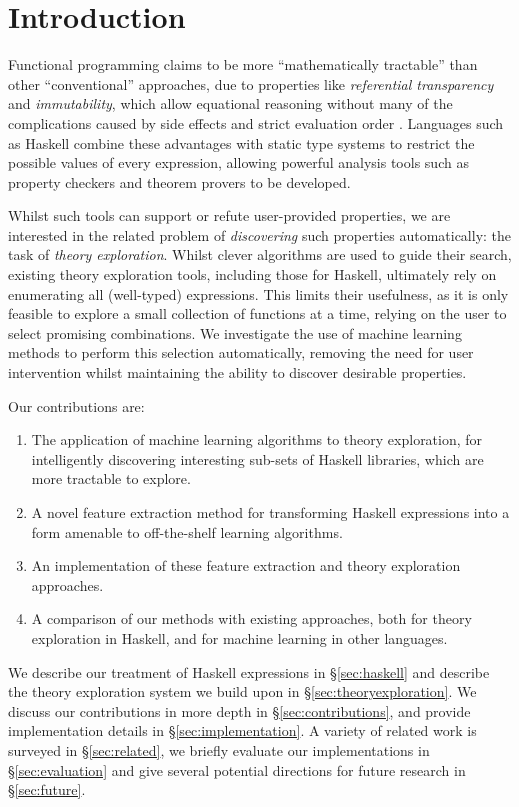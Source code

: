 \section{Introduction}

Functional programming claims to be more ``mathematically tractable'' than other ``conventional'' approaches, due to properties like \emph{referential transparency} and \emph{immutability}, which allow equational reasoning without many of the complications caused by side effects and strict evaluation order \cite{hughes1989functional}. Languages such as Haskell combine these advantages with static type systems to restrict the possible values of every expression, allowing powerful analysis tools such as property checkers \cite{claessen2011quickcheck} and theorem provers \cite{rosen2012proving} to be developed.

Whilst such tools can support or refute user-provided properties, we are interested in the related problem of \emph{discovering} such properties automatically: the task of \emph{theory exploration}. Whilst clever algorithms are used to guide their search, existing theory exploration tools, including those for Haskell, ultimately rely on enumerating all (well-typed) expressions. This limits their usefulness, as it is only feasible to explore a small collection of functions at a time, relying on the user to select promising combinations. We investigate the use of machine learning methods to perform this selection automatically, removing the need for user intervention whilst maintaining the ability to discover desirable properties.

Our contributions are:

\begin{enumerate}
  \item The application of machine learning algorithms to theory exploration, for intelligently discovering interesting sub-sets of Haskell libraries, which are more tractable to explore.
  \item A novel feature extraction method for transforming Haskell expressions into a form amenable to off-the-shelf learning algorithms.
  \item An implementation of these feature extraction and theory exploration approaches.
  \item A comparison of our methods with existing approaches, both for theory exploration in Haskell, and for machine learning in other languages.
\end{enumerate}

We describe our treatment of Haskell expressions in \S \ref{sec:haskell} and describe the \qspec{} theory exploration system we build upon in \S \ref{sec:theoryexploration}. We discuss our contributions in more depth in \S \ref{sec:contributions}, and provide implementation details in \S \ref{sec:implementation}. A variety of related work is surveyed in \S \ref{sec:related}, we briefly evaluate our implementations in \S \ref{sec:evaluation} and give several potential directions for future research in \S \ref{sec:future}.
